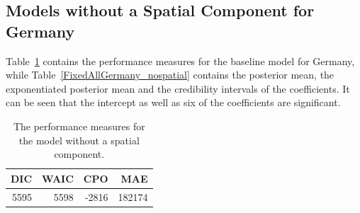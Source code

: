 \subsection{Models without a Spatial Component for Germany}\label{sec:nospatial_germany}
Table~\ref{allGermany_nospatial} contains the performance measures for the baseline model for Germany, while Table~\ref{FixedAllGermany_nospatial} contains the posterior mean, the exponentiated posterior mean and the credibility intervals of the coefficients. It can be seen that the intercept as well as six of the coefficients are significant.
\begin{table}[H] 
\caption{The performance measures for the model without a spatial component. \label{allGermany_nospatial}}
\begin{tabular}{r r r r}
\toprule
\textbf{DIC}	& \textbf{WAIC} & \textbf{CPO} & \textbf{MAE}\\
\midrule
5595 & 5598 & -2816 & 182174 \\
\bottomrule
\end{tabular}
\end{table}
